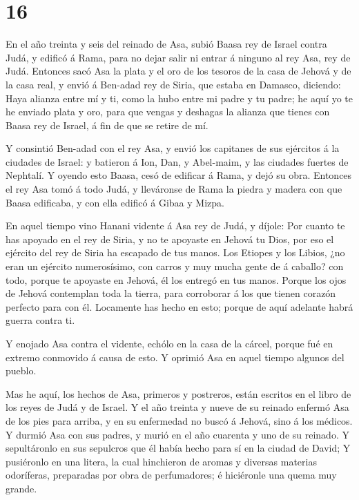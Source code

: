 \hypertarget{section-15}{%
\section{16}\label{section-15}}

 En el año treinta y seis del reinado de Asa, subió Baasa
rey de Israel contra Judá, y edificó á Rama, para no dejar salir ni
entrar á ninguno al rey Asa, rey de Judá.  Entonces sacó Asa
la plata y el oro de los tesoros de la casa de Jehová y de la casa real,
y envió á Ben-adad rey de Siria, que estaba en Damasco, diciendo:
 Haya alianza entre mí y ti, como la hubo entre mi padre y
tu padre; he aquí yo te he enviado plata y oro, para que vengas y
deshagas la alianza que tienes con Baasa rey de Israel, á fin de que se
retire de mí.

 Y consintió Ben-adad con el rey Asa, y envió los capitanes
de sus ejércitos á la ciudades de Israel: y batieron á Ion, Dan, y
Abel-maim, y las ciudades fuertes de Nephtalí.  Y oyendo
esto Baasa, cesó de edificar á Rama, y dejó su obra. 
Entonces el rey Asa tomó á todo Judá, y lleváronse de Rama la piedra y
madera con que Baasa edificaba, y con ella edificó á Gibaa y Mizpa.

 En aquel tiempo vino Hanani vidente á Asa rey de Judá, y
díjole: Por cuanto te has apoyado en el rey de Siria, y no te apoyaste
en Jehová tu Dios, por eso el ejército del rey de Siria ha escapado de
tus manos.  Los Etiopes y los Libios, ¿no eran un ejército
numerosísimo, con carros y muy mucha gente de á caballo? con todo,
porque te apoyaste en Jehová, él los entregó en tus manos. 
Porque los ojos de Jehová contemplan toda la tierra, para corroborar á
los que tienen corazón perfecto para con él. Locamente has hecho en
esto; porque de aquí adelante habrá guerra contra ti.

 Y enojado Asa contra el vidente, echólo en la casa de la
cárcel, porque fué en extremo conmovido á causa de esto. Y oprimió Asa
en aquel tiempo algunos del pueblo.

 Mas he aquí, los hechos de Asa, primeros y postreros,
están escritos en el libro de los reyes de Judá y de Israel.
 Y el año treinta y nueve de su reinado enfermó Asa de los
pies para arriba, y en su enfermedad no buscó á Jehová, sino á los
médicos.  Y durmió Asa con sus padres, y murió en el año
cuarenta y uno de su reinado.  Y sepultáronlo en sus
sepulcros que él había hecho para sí en la ciudad de David; Y pusiéronlo
en una litera, la cual hinchieron de aromas y diversas materias
odoríferas, preparadas por obra de perfumadores; é hiciéronle una quema
muy grande.


